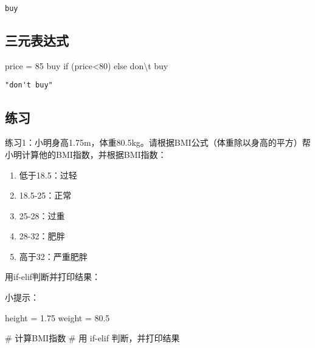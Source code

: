 \documentclass[
  letterpaper,
  DIV=11,
  numbers=noendperiod]{scrreprt}
\newenvironment{Shaded}{\begin{snugshade}}{\end{snugshade}}
\newcommand{\CharTok}[1]{\textcolor[rgb]{0.13,0.47,0.30}{#1}}
\newcommand{\CommentTok}[1]{\textcolor[rgb]{0.37,0.37,0.37}{#1}}
\newcommand{\ControlFlowTok}[1]{\textcolor[rgb]{0.00,0.23,0.31}{#1}}
\newcommand{\DecValTok}[1]{\textcolor[rgb]{0.68,0.00,0.00}{#1}}
\newcommand{\FloatTok}[1]{\textcolor[rgb]{0.68,0.00,0.00}{#1}}
\newcommand{\NormalTok}[1]{\textcolor[rgb]{0.00,0.23,0.31}{#1}}
\newcommand{\OperatorTok}[1]{\textcolor[rgb]{0.37,0.37,0.37}{#1}}
\newcommand{\StringTok}[1]{\textcolor[rgb]{0.13,0.47,0.30}{#1}}
\providecommand{\tightlist}{%
  \setlength{\itemsep}{0pt}\setlength{\parskip}{0pt}}\usepackage{longtable,booktabs,array}
\begin{document}
\begin{verbatim}
buy
\end{verbatim}

\hypertarget{ux4e09ux5143ux8868ux8fbeux5f0f}{%
\subsection{三元表达式}\label{ux4e09ux5143ux8868ux8fbeux5f0f}}

\begin{Shaded}
\begin{Highlighting}[]
\NormalTok{price }\OperatorTok{=} \DecValTok{85}
\CommentTok{\textquotesingle{}buy\textquotesingle{}} \ControlFlowTok{if}\NormalTok{ (price}\OperatorTok{\textless{}}\DecValTok{80}\NormalTok{) }\ControlFlowTok{else} \StringTok{\textquotesingle{}don}\CharTok{\textbackslash{}\textquotesingle{}}\StringTok{t buy\textquotesingle{}}
\end{Highlighting}
\end{Shaded}

\begin{verbatim}
"don't buy"
\end{verbatim}

\hypertarget{ux7ec3ux4e60}{%
\subsection{练习}\label{ux7ec3ux4e60}}

练习1：小明身高1.75m，体重80.5kg。请根据BMI公式（体重除以身高的平方）帮小明计算他的BMI指数，并根据BMI指数：

\begin{enumerate}
\def\labelenumi{\arabic{enumi}.}
\tightlist
\item
  低于18.5：过轻
\item
  18.5-25：正常
\item
  25-28：过重
\item
  28-32：肥胖
\item
  高于32：严重肥胖
\end{enumerate}

用if-elif判断并打印结果：

小提示：

\begin{Shaded}
\begin{Highlighting}[]
\NormalTok{height }\OperatorTok{=} \FloatTok{1.75}
\NormalTok{weight }\OperatorTok{=} \FloatTok{80.5}

\CommentTok{\# 计算BMI指数}
\CommentTok{\# 用 if{-}elif 判断，并打印结果}
\end{Highlighting}
\end{Shaded}
\end{document}
